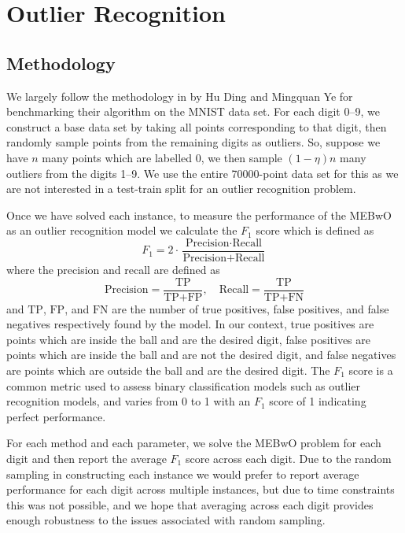 \documentclass[11pt,twoside]{report}
\theoremstyle{definition}
\numberwithin{theorem}{section}
\numberwithin{definition}{section}
\numberwithin{lemma}{section}
\numberwithin{proposition}{section}
\numberwithin{equation}{section}
\numberwithin{figure}{section}
\begin{document}
\section{Outlier Recognition}\label{sec:outlier_recognition}
\subsection{Methodology}
We largely follow the methodology in \cite[Section 4.2]{huding} by Hu Ding and Mingquan Ye for benchmarking their algorithm on the MNIST data set. For each digit 0--9, we construct a base data set by taking all points corresponding to that digit, then randomly sample points from the remaining digits as outliers. So, suppose we have $n$ many points which are labelled 0, we then sample $(1-\eta)n$ many outliers from the digits 1--9. We use the entire 70000-point data set for this as we are not interested in a test-train split for an outlier recognition problem.

Once we have solved each instance, to measure the performance of the MEBwO as an outlier recognition model we calculate the $F_1$ score which is defined as
\begin{equation*}
    F_1 = 2\cdot\frac{\text{Precision}\cdot\text{Recall}}{\text{Precision}+\text{Recall}}
\end{equation*}
where the precision and recall are defined as 
\begin{equation*}
    \text{Precision} = \frac{\text{TP}}{\text{TP} + \text{FP}},\quad \text{Recall} = \frac{\text{TP}}{\text{TP}+\text{FN}}
\end{equation*}
and $\text{TP}$, $\text{FP}$, and $\text{FN}$ are the number of true positives, false positives, and false negatives respectively found by the model. In our context, true positives are points which are inside the ball and are the desired digit, false positives are points which are inside the ball and are not the desired digit, and false negatives are points which are outside the ball and are the desired digit. The $F_1$ score is a common metric used to assess binary classification models such as outlier recognition models, and varies from 0 to 1 with an $F_1$ score of 1 indicating perfect performance.

For each method and each parameter, we solve the MEBwO problem for each digit and then report the average $F_1$ score across each digit. Due to the random sampling in constructing each instance we would prefer to report average performance for each digit across multiple instances, but due to time constraints this was not possible, and we hope that averaging across each digit provides enough robustness to the issues associated with random sampling.
\end{document}
